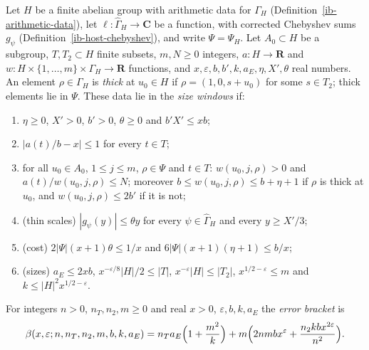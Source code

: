 \begin{definition}\label{ib-size-windows}
Let $H$ be a finite abelian group with arithmetic data for $\Gamma_H$
(Definition~\ref{ib-arithmetic-data}), let $\ell:\widehat\Gamma_H\to\mathbf C$ be
a function, with corrected Chebyshev sums $g_\psi$ (Definition~\ref{ib-host-chebyshev}),
and write $\Psi=\Psi_H$. Let $A_0\subset H$ be a subgroup, $T,T_2\subset H$ finite
subsets, $m,N\geq0$ integers, $a:H\to\mathbf R$ and
$w:H\times\{1,\ldots,m\}\times\Gamma_H\to\mathbf R$ functions, and
$x,\varepsilon,b,b',k,a_E,\eta,X',\theta$ real numbers. An element
$\rho\in\Gamma_H$ is \emph{thick} at $u_0\in H$ if $\rho=(1,0,s+u_0)$ for some
$s\in T_2$; thick elements lie in $\Psi$. These data lie in the \emph{size
windows} if:
\begin{enumerate}
\item[(W1)] $\eta\geq0$, $X'>0$, $b'>0$, $\theta\geq0$ and $b'X'\leq xb$;
\item[(W2)] $|a(t)/b-x|\leq1$ for every $t\in T$;
\item[(W3)] for all $u_0\in A_0$, $1\leq j\leq m$, $\rho\in\Psi$ and $t\in T$:
  $w(u_0,j,\rho)>0$ and $a(t)/w(u_0,j,\rho)\leq N$; moreover
  $b\leq w(u_0,j,\rho)\leq b+\eta+1$ if $\rho$ is thick at $u_0$, and
  $w(u_0,j,\rho)\leq2b'$ if it is not;
\item[(W4)] (thin scales) $|g_\psi(y)|\leq\theta y$ for every
  $\psi\in\widehat\Gamma_H$ and every $y\geq X'/3$;
\item[(W5)] (cost) $2|\Psi|(x+1)\theta\leq1/x$ and
  $6|\Psi|(x+1)(\eta+1)\leq b/x$;
\item[(W6)] (sizes) $a_E\leq2xb$, $x^{-\varepsilon/8}|H|/2\leq|T|$,
  $x^{-\varepsilon}|H|\leq|T_2|$, $x^{1/2-\varepsilon}\leq m$ and
  $k\leq|H|^2x^{1/2-\varepsilon}$.
\end{enumerate}
For integers $n>0$, $n_T,n_2,m\geq0$ and real $x>0$, $\varepsilon,b,k,a_E$ the
\emph{error bracket} is
\[
 \beta(x,\varepsilon;n,n_T,n_2,m,b,k,a_E)=n_Ta_E\Bigl(1+\frac{m^2}k\Bigr)
 +m\Bigl(2nmbx^{\varepsilon}+\frac{n_2kbx^{2\varepsilon}}{n^2}\Bigr).
\]
\end{definition}

